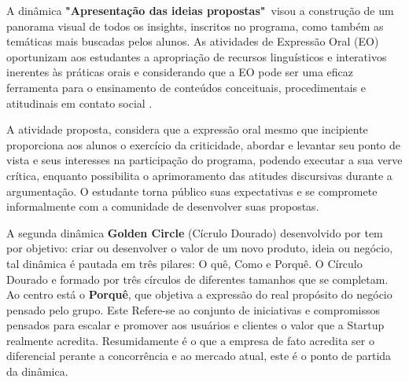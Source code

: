 A dinâmica \textbf{"Apresentação das ideias propostas"}\ visou a construção de um panorama visual de todos os insights, inscritos no programa, como também as temáticas mais buscadas pelos alunos. As atividades de Expressão Oral (EO) oportunizam aos estudantes a apropriação de recursos linguísticos e interativos inerentes às práticas orais e considerando que a EO pode ser uma eficaz ferramenta para o ensinamento de conteúdos conceituais, procedimentais e atitudinais em contato social \cite{baltar_genero_2010}.

A atividade proposta, considera que a expressão oral mesmo que incipiente proporciona aos alunos o exercício da criticidade, abordar e levantar seu ponto de vista e seus interesses na participação do programa, podendo executar a sua verve crítica, enquanto possibilita o aprimoramento das atitudes discursivas durante a argumentação. O estudante torna público suas expectativas e se compromete informalmente com a comunidade de desenvolver suas propostas.

A segunda dinâmica \textbf{Golden Circle} (Cícrulo Dourado) desenvolvido por  tem por objetivo: criar ou desenvolver o valor de um novo produto, ideia ou negócio, tal dinâmica é pautada em três pilares: O quê, Como e Porquê. O Círculo Dourado e formado por três círculos de diferentes tamanhos que se completam. Ao centro está o \textbf{Porquê}, que objetiva a expressão do real propósito do negócio pensado pelo grupo. Este Refere-se ao conjunto de iniciativas e compromissos pensados para escalar e promover aos usuários e clientes o valor que a Startup realmente acredita. Resumidamente é o que a empresa de fato acredita ser o  diferencial perante a concorrência e ao mercado atual, este é o ponto de partida da dinâmica.


